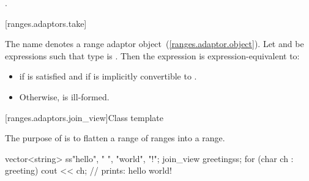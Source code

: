\begin{itemdescr}
\pnum
\returns {}.
\end{itemdescr}

[ranges.adaptors.take]{}

\pnum
The name  denotes a range adaptor
object~(\ref{ranges.adaptor.object}). Let  and  be expressions such
that type  is . Then the expression
 is expression-equivalent to:

\begin{itemize}
\item {} if  is satisfied and if 
is implicitly convertible to .
\item Otherwise,  is ill-formed.
\end{itemize}

[ranges.adaptors.join_view]{Class template }

\pnum
The purpose of  is to flatten a range of ranges into a
range.

\pnum
\enterexample
\begin{codeblock}
vector<string> ss{"hello", " ", "world", "!"};
join_view greeting{ss};
for (char ch : greeting)
  cout << ch; // prints: hello world!
\end{codeblock}
\exitexample

